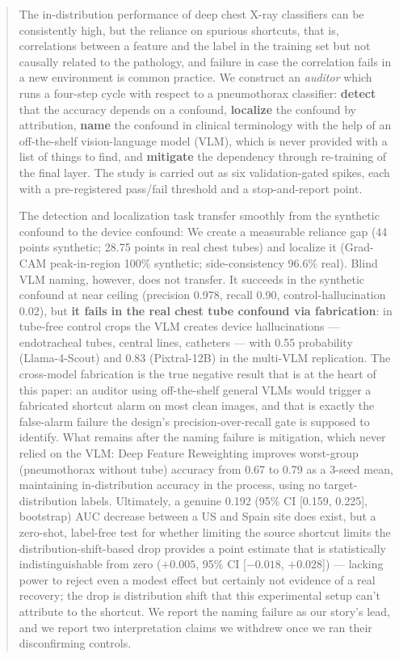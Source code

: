 \documentclass{ieeeaccess}
\begin{document}
\begin{abstract}
The in-distribution performance of deep chest X-ray classifiers can be consistently high, but the reliance on spurious shortcuts, that is, correlations between a feature and the label in the training set but not causally related to the pathology, and failure in case the correlation fails in a new environment is common practice. We construct an \emph{auditor} which runs a four-step cycle with respect to a pneumothorax classifier: \textbf{detect} that the accuracy depends on a confound, \textbf{localize} the confound by attribution, \textbf{name} the confound in clinical terminology with the help of an off-the-shelf vision-language model (VLM), which is never provided with a list of things to find, and \textbf{mitigate} the dependency through re-training of the final layer. The study is carried out as six validation-gated spikes, each with a pre-registered pass/fail threshold and a stop-and-report point.

The detection and localization task transfer smoothly from the synthetic confound to the device confound: We create a measurable reliance gap (44 points synthetic; 28.75 points in real chest tubes) and localize it (Grad-CAM peak-in-region 100\% synthetic; side-consistency 96.6\% real). Blind VLM naming, however, does not transfer. It succeeds in the synthetic confound at near ceiling (precision 0.978, recall 0.90, control-hallucination 0.02), but \textbf{it fails in the real chest tube confound via fabrication}: in tube-free control crops the VLM creates device hallucinations --- endotracheal tubes, central lines, catheters --- with 0.55 probability (Llama-4-Scout) and 0.83 (Pixtral-12B) in the multi-VLM replication. The cross-model fabrication is the true negative result that is at the heart of this paper: an auditor using off-the-shelf general VLMs would trigger a fabricated shortcut alarm on most clean images, and that is exactly the false-alarm failure the design's precision-over-recall gate is supposed to identify. What remains after the naming failure is mitigation, which never relied on the VLM: Deep Feature Reweighting improves worst-group (pneumothorax without tube) accuracy from 0.67 to 0.79 as a 3-seed mean, maintaining in-distribution accuracy in the process, using no target-distribution labels. Ultimately, a genuine 0.192 (95\% CI [0.159, 0.225], bootstrap) AUC decrease between a US and Spain site does exist, but a zero-shot, label-free test for whether limiting the source shortcut limits the distribution-shift-based drop provides a point estimate that is statistically indistinguishable from zero ($+0.005$, 95\% CI [$-0.018$, $+0.028$]) --- lacking power to reject even a modest effect but certainly not evidence of a real recovery; the drop is distribution shift that this experimental setup can't attribute to the shortcut. We report the naming failure as our story's lead, and we report two interpretation claims we withdrew once we ran their disconfirming controls.
\end{abstract}
\end{document}
